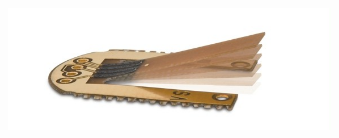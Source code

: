 \begin{frame}
\begin{columns}[c]
\begin{figure}[H]
\begin{center}
            \end{center}
            \end{figure}
            \begin{figure}[H]
            \begin{center}
                    \includegraphics[scale=0.1]{./img/misc/kraftsensor.jpg}
            \end{center}
            \end{figure}
    \end{columns}
\end{frame}
